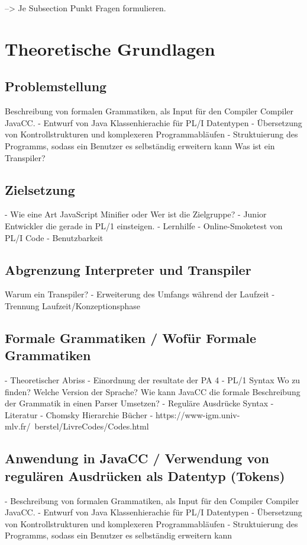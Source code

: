 --> Je Subsection Punkt Fragen formulieren.

\section{Theoretische Grundlagen}
	\subsection{Problemstellung}
  Beschreibung von formalen Grammatiken, als Input für den Compiler Compiler JavaCC.
- Entwurf von Java Klassenhierachie für PL/I Datentypen
- Übersetzung von Kontrollstrukturen und komplexeren Programmabläufen
- Struktuierung des Programms, sodass ein Benutzer es selbständig erweitern kann
     Was ist ein Transpiler?
	\subsection{Zielsetzung}
 - Wie eine Art JavaScript Minifier oder 
    Wer ist die Zielgruppe?
    - Junior Entwickler die gerade in PL/1 einsteigen.
    - Lernhilfe
    - Online-Smoketest von PL/I Code
    - Benutzbarkeit
	\subsection{Abgrenzung Interpreter und Transpiler}
    Warum ein Transpiler?
    - Erweiterung des Umfangs während der Laufzeit
    - Trennung Laufzeit/Konzeptionsphase
	\subsection{Formale Grammatiken / Wofür Formale Grammatiken}
     - Theoretischer Abriss
    - Einordnung der resultate der PA 4
	- PL/1 Syntax Wo zu finden? Welche Version der Sprache? 
     Wie kann JavaCC die formale Beschreibung der Grammatik in einen Parser Umsetzen?
	- Reguläre Ausdrücke Syntax
    - Literatur
	    - Chomsky Hierarchie Bücher
	    - https://www-igm.univ-mlv.fr/~berstel/LivreCodes/Codes.html
	\subsection{Anwendung in JavaCC / Verwendung von regulären Ausdrücken als Datentyp (Tokens)}
     - Beschreibung von formalen Grammatiken, als Input für den Compiler Compiler JavaCC.
     - Entwurf von Java Klassenhierachie für PL/I Datentypen
     - Übersetzung von Kontrollstrukturen und komplexeren Programmabläufen
     - Struktuierung des Programms, sodass ein Benutzer es selbständig erweitern kann

